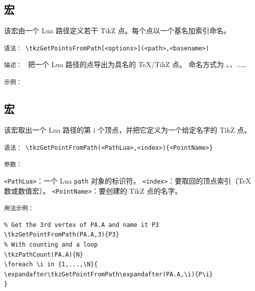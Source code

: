 

\subsection{宏 }
该宏由一个 Lua 路径定义若干 TikZ 点。每个点以一个基名加索引命名。

\texttt{语法： }\verb|\tkzGetPointsFromPath[<options>](<path>,<basename>)|

\medskip
\texttt{描述： }
把一个 Lua 路径的点导出为具名的 \TeX/TikZ 点。
命名方式为 、、……

\medskip
\texttt{示例： }

\begin{tkzexample}[latex=.5\textwidth]
\end{tkzexample}




\subsection{宏 }
该宏取出一个 Lua 路径的第 i 个顶点，并把它定义为一个给定名字的 TikZ 点。

\texttt{语法： }\verb|\tkzGetPointFromPath(<PathLua>,<index>){<PointName>}|

\texttt{参数： }

\verb|<PathLua>|：一个 Lua \verb|path| 对象的标识符。
\verb|<index>|：要取回的顶点索引（TeX 数或数值宏）。
\verb|<PointName>|：要创建的 TikZ 点的名字。
\medskip


\texttt{用法示例：}

\begin{mybox}
\begin{verbatim}
% Get the 3rd vertex of PA.A and name it P3
\tkzGetPointFromPath(PA.A,3){P3}
% With counting and a loop
\tkzPathCount(PA.A){N}
\foreach \i in {1,...,\N}{
\expandafter\tkzGetPointFromPath\expandafter(PA.A,\i){P\i}
}
\end{verbatim}
\end{mybox}




